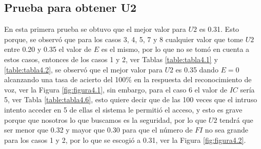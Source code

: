 \subsection{Prueba para obtener U2}
\par
En esta primera prueba se obtuvo que el mejor valor para $U2$ es 0.31. Esto porque, se observó que para los casos 3, 4, 5, 7 y 8 cualquier valor que tome $U2$ entre 0.20 y 0.35 el valor de $E$ es el mismo, por lo que no se tomó en cuenta a estos casos, entonces de los casos 1 y 2, ver Tablas \ref{table:tabla4.1} y \ref{table:tabla4.2}, se observó que el mejor valor para $U2$ es 0.35 dando $E = 0$ alcanzando una tasa de acierto del 100\% en la respuesta del reconocimiento de voz, ver la Figura \ref{fig:figura4.1}, sin embargo, para el caso 6 el valor de $IC$ sería 5, ver Tabla \ref{table:tabla4.6}, esto quiere decir que de las 100 veces que el intruso intento acceder en 5 de ellas el sistema le permitió el acceso, y esto es grave porque que nosotros lo que buscamos es la seguridad, por lo que $U2$ tendrá que ser menor que 0.32 y mayor que 0.30 para que el número de $FI$ no sea grande para los casos 1 y 2, por lo que se escogió a 0.31, ver la Figura \ref{fig:figura4.2}.

